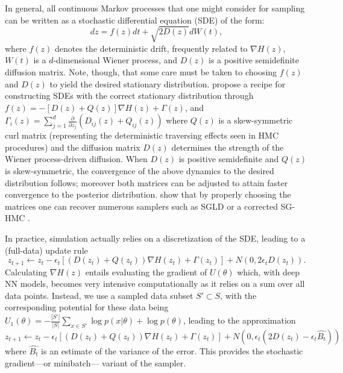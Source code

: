 In general, all continuous Markov processes that one might consider for sampling can be written
as a stochastic differential equation (SDE) of the form:
\begin{equation}
dz = f(z)dt +
\sqrt{ 2D(z)}dW(t),
\end{equation}
where $f(z)$ denotes the deterministic drift, frequently
related to $\nabla H(z)$,
$W(t)$  is a $d$-dimensional Wiener process, and 
$D(z)$ is a positive semidefinite diffusion matrix. Note, though,
that some care must be taken to choosing $f(z)$ and $D(z)$ 
to yield the desired stationary distribution.
\cite{ma2015complete} propose a recipe for constructing SDEs with the correct stationary distribution through 
$f(z) = - [D(z) + Q(z)] \nabla H(z) + \Gamma (z)$, 
and $\Gamma _i (z) = \sum _{j=1}^d 
\frac{\partial  }{\partial z_j}(D_{ij} (z) + Q_{ij} (z) )
$
where $ Q(z)$ is a skew-symmetric curl matrix (representing the deterministic traversing effects seen
in HMC procedures) and the diffusion matrix $D(z)$
determines the strength of the Wiener process-driven diffusion.
When 
$D(z)$ is positive semidefinite and $Q(z)$ is skew-symmetric, 
 the convergence of the above dynamics to the desired 
distribution follows; moreover both matrices can be adjusted to attain faster convergence to
the posterior distribution. \cite{ma2015complete} show that by properly choosing the matrices  one can recover numerous samplers such
as SGLD \cite{welling2011bayesian} or a corrected SG-HMC \cite{chen2014stochastic}.

In practice, simulation actually relies on a discretization of the SDE, leading to a (full-data) update rule
\begin{equation}
z_{t+1} \leftarrow z_t - \epsilon_t \left[ ( D(z_t) + Q(z_t) )
\nabla H(z_t) + \Gamma (z_t)\right]
+ N (0, 2\epsilon _t D(z_t)).
\end{equation} 
Calculating $\nabla H(z)$ entails evaluating the gradient of $U(\theta )$
which, with deep NN models, 
 becomes very intensive computationally as it relies on a sum
over all data points. Instead, 
we use a sampled data subset $S' \subset S$, with the corresponding potential for these data being 
$U_1 (\theta ) = -\frac{|S'|}{|S|} \sum _{x \in S'}
\log p(x|\theta ) + \log p(\theta )$, leading 
to the approximation 
\begin{equation}
z_{t+1} \leftarrow z_t - \epsilon_t \left[ ( D(z_t) + Q(z_t) )
\nabla H (z_t) + \Gamma (z_t) \right]
+ N (0, \epsilon _t (2 D(z_t)- \epsilon_t \hat {B_t}))
\end{equation} 
where $\hat {B_t}$ is an estimate of the variance of the error.
This provides the  stochastic gradient—or minibatch— variant of the sampler. 


